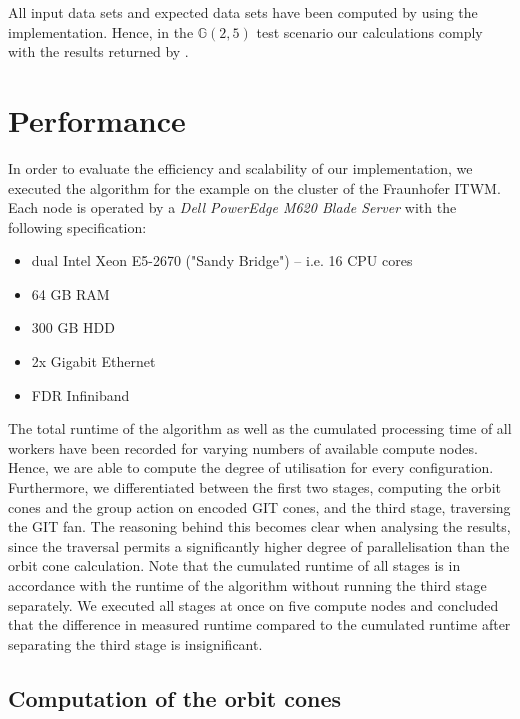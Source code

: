 All input data sets and expected data sets have been computed by using the \gitfanlib{} implementation. Hence, in the $\mathbb{G}(2,5)$ test scenario our calculations comply with the results returned by \gitfanlib{}.

\section{Performance}

In order to evaluate the efficiency and scalability of our implementation, we executed the algorithm for the \msix{} example on the cluster of the \ac{Fraunhofer ITWM}. Each node is operated by a \emph{Dell PowerEdge M620 Blade Server} with the following specification:
\begin{itemize}
	\item dual Intel Xeon E5-2670 ("Sandy Bridge") -- i.e. 16 CPU cores
	\item 64 GB RAM
	\item 300 GB HDD
	\item 2x Gigabit Ethernet
	\item FDR Infiniband
\end{itemize}

The total runtime of the algorithm as well as the cumulated processing time of all workers have been recorded for varying numbers of available compute nodes. Hence, we are able to compute the degree of utilisation for every configuration. Furthermore, we differentiated between the first two stages, computing the orbit cones and the group action on encoded GIT cones, and the third stage, traversing the GIT fan. The reasoning behind this becomes clear when analysing the results, since the traversal permits a significantly higher degree of parallelisation than the orbit cone calculation. Note that the cumulated runtime of all stages is in accordance with the runtime of the algorithm without running the third stage separately. We executed all stages at once on five compute nodes and concluded that the difference in measured runtime compared to the cumulated runtime after separating the third stage is insignificant.

\subsection*{Computation of the orbit cones}

